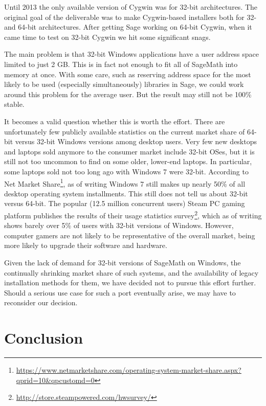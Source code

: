 Until 2013 the only available version of Cygwin was for 32-bit
architectures. The original goal of the deliverable was to make
Cygwin-based installers both for 32- and 64-bit architectures. After
getting Sage working on 64-bit Cygwin, when it came time to test on
32-bit Cygwin we hit some significant snags.

The main problem is that 32-bit Windows applications have a user address
space limited to just 2 GB. This is in fact not enough to fit all of
SageMath into memory at once. With some care, such as reserving address
space for the most likely to be used (especially simultaneously)
libraries in Sage, we could work around this problem for the average user.
But the result may still not be 100\% stable.

It becomes a valid question whether this is worth the effort. There are
unfortunately few publicly available statistics on the current market
share of 64-bit versus 32-bit Windows versions among desktop users. Very
few new desktops and laptops sold anymore to the consumer market include
32-bit OSes, but it is still not too uncommon to find on some older,
lower-end laptops. In particular, some laptops sold not too long ago
with Windows 7 were 32-bit. According to Net Market Share\footnote{\url{https://www.netmarketshare.com/operating-system-market-share.aspx?qprid=10\&qpcustomd=0}},
as of writing Windows 7 still makes up nearly 50\% of all desktop
operating system installments. This still does not tell us about 32-bit
versus 64-bit. The popular (12.5 million concurrent users) Steam PC
gaming platform publishes the results of their usage statistics
survey\footnote{\url{http://store.steampowered.com/hwsurvey/}}, which as
of writing shows barely over 5\% of users with 32-bit versions of
Windows. However, computer gamers are not likely to be representative of
the overall market, being more likely to upgrade their software and
hardware.

Given the lack of demand for 32-bit versions of SageMath on Windows, the
continually shrinking market share of such systems, and the availability of
legacy installation methods for them, we have decided not to pursue this effort
further. Should a serious use case for such a port eventually arise, we may
have to reconsider our decision.

\section{Conclusion}\label{conclusion}

